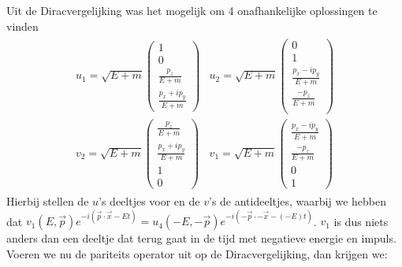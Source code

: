 \documentclass[../main.tex]{subfiles}
\begin{document}
Uit de Diracvergelijking was het mogelijk om 4 onafhankelijke oplossingen te vinden
\begin{equation}
    \begin{aligned}
        \label{eq:dirac_fermions}
        \begin{matrix}
            u_1 = \sqrt{E+m}
            \begin{pmatrix}
                1\\
                0\\
                \frac{p_z}{E+m}\\
                \frac{p_x + ip_y}{E+m} 
            \end{pmatrix} &
            u_2 = \sqrt{E+m}
            \begin{pmatrix}
                0\\
                1\\
                \frac{p_x - ip_y}{E+m}\\ 
                \frac{-p_z}{E+m}\\
            \end{pmatrix} \\
            v_2 = \sqrt{E+m}
            \begin{pmatrix}
                \frac{p_z}{E+m}\\
                \frac{p_x + ip_y}{E+m}\\ 
                1\\
                0
            \end{pmatrix} &
            v_1 = \sqrt{E+m}
            \begin{pmatrix}
                \frac{p_x - ip_y}{E+m} \\
                \frac{-p_z}{E+m}\\
                0\\
                1
            \end{pmatrix}
        \end{matrix}
    \end{aligned}
\end{equation}
Hierbij stellen de $u$'s deeltjes voor en de $v$'s de antideeltjes, waarbij we hebben dat $v_1(E,\vec{p})e^{-i(\vec{p}\cdot \vec{x}-Et)} = u_4(-E,-\vec{p})e^{-i(-\vec{p}\cdot -\vec{x}-(-E)t)}$. $v_1$ is dus niets anders dan een deeltje dat terug gaat in de tijd met negatieve energie en impuls. Voeren we nu de pariteits operator uit op de Diracvergelijking, dan krijgen we:
\end{document}
